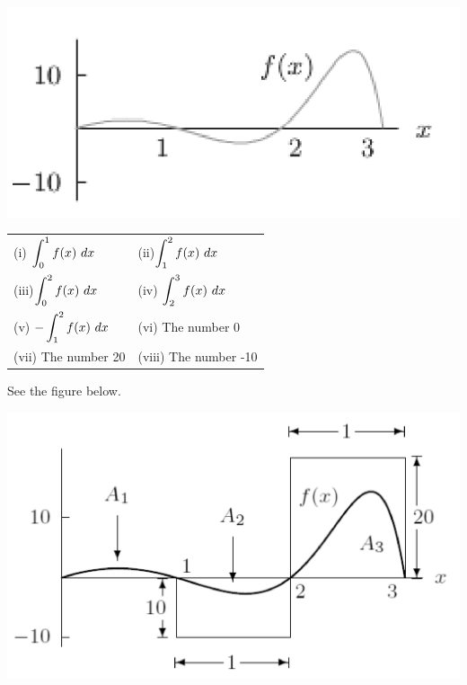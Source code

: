 \begin{enumerate}[1.]
\begin{multicols}{2}
\begin{Question}
\includegraphics[width=0.6\linewidth]{graphics/Week04_PropertiesOfDefiniteIntegrals/IntegralRanking}

\begin{tabular}{ll}
(i) $\displaystyle \int_0^1 f(x)~dx $ & 
(ii)$\displaystyle \int_1^2  f(x)~dx $ \\
(iii)$\displaystyle \int_0^2  f (x)~dx $ & 
(iv) $\displaystyle \int_2^3 f(x)~dx $ \\
(v) $-\displaystyle \int_1^2  f(x)~dx $ &
(vi) The number 0  \\
(vii) The number 20  &
(viii) The number -10
\end{tabular}
  \end{Question}

  \begin{Solution}
    See the figure below.

\includegraphics[width=0.8\linewidth]{graphics/Week04_PropertiesOfDefiniteIntegrals/IntegralRanking_solutions}


\end{Solution}
\end{multicols}
\end{enumerate}
